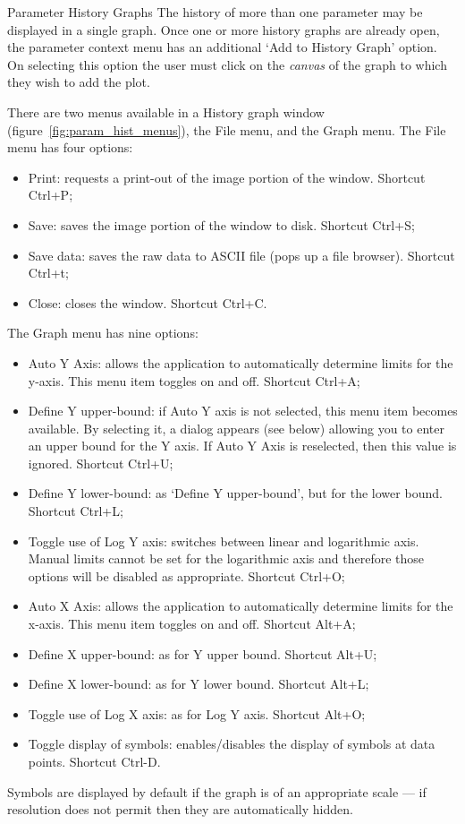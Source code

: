\documentclass[a4paper,twoside]{article}
\begin{document}
\begin{section}{Parameter History Graphs}
The history of more than one parameter may be displayed in a single
graph.  Once one or more history graphs are already open, the
parameter context menu has an additional `Add to History Graph'
option. On selecting this option the user must click on the {\em canvas} of
the graph to which they wish to add the plot.

There are two menus available in a History graph window
(figure~\ref{fig:param_hist_menus}), the File menu, and the Graph
menu. The File menu has four options:
\begin{itemize}
\item Print: requests a print-out of the image portion of the window.
Shortcut Ctrl+P;
\item Save: saves the image portion of the window to disk. Shortcut Ctrl+S;
\item Save data: saves the raw data to ASCII file (pops up a file browser).
Shortcut Ctrl+t;
\item Close: closes the window. Shortcut Ctrl+C.
\end{itemize}
The Graph menu has nine options:
\begin{itemize}
\item Auto Y Axis: allows the application to automatically determine
limits for the y-axis. This menu item toggles on and off.
Shortcut Ctrl+A;
\item Define Y upper-bound: if Auto Y axis is not selected, this
menu item becomes available. By selecting it, a dialog appears
(see below) allowing you to enter an upper bound for the Y axis.
If Auto Y Axis is reselected, then this value is ignored.
Shortcut Ctrl+U;
\item Define Y lower-bound: as `Define Y upper-bound', but for
the lower bound. Shortcut Ctrl+L;
\item Toggle use of Log Y axis: switches between linear and
logarithmic axis.  Manual limits cannot be set for the logarithmic
axis and therefore those options will be disabled as appropriate.
Shortcut Ctrl+O;
\item Auto X Axis: allows the application to automatically
determine limits for the x-axis. This menu item toggles on and
off. Shortcut Alt+A;
\item Define X upper-bound: as for Y upper bound. Shortcut Alt+U;
\item Define X lower-bound: as for Y lower bound. Shortcut Alt+L;
\item Toggle use of Log X axis:	as for Log Y axis. Shortcut Alt+O;
\item Toggle display of symbols: enables/disables the display of
symbols at data points. Shortcut Ctrl-D.
\end{itemize}
Symbols are displayed by default if the graph is of an appropriate
scale --- if resolution does not permit then they are automatically
hidden.


\end{section}
\end{document}
